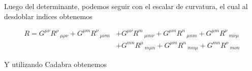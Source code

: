 \documentclass{article}
\numberwithin{equation}{section}
\begin{document}
%
%


Luego del determinante, podemos seguir con el escalar de curvatura, el cual al desdoblar indices obtenemos

\begin{equation}
\begin{aligned}
R= G^{\mu \nu} R^{\rho}\,_{\mu \rho \nu}+G^{\mu m} R^{\nu}\,_{\mu \nu m}&+G^{\mu \nu} R^{m}\,_{\mu m \nu}+G^{\mu m} R^{n}\,_{\mu n m}+G^{\mu m} R^{\nu}\,_{m \nu \mu}\\
&+G^{m n} R^{\mu}\,_{m \mu n}+G^{\mu m} R^{n}\,_{m n \mu}+G^{m n} R^{o}\,_{m o n}
\end{aligned}
\end{equation}

Y utilizando Cadabra obtenemos
\end{document}
